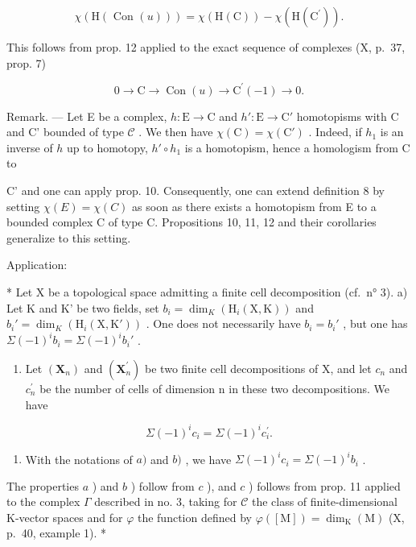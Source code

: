 \[
\chi (\mathrm{H} (\text { Con } (u))) = \chi (\mathrm{H} (\mathrm{C})) - \chi (\mathrm{H} (\mathrm{C} ^ {\prime})) .
\]

This follows from prop. 12 applied to the exact sequence of complexes (X, p.~37, prop. 7)

\[
0 \rightarrow \mathrm{C} \rightarrow \operatorname{Con} (u) \rightarrow \mathrm{C} ^ {\prime} (- 1) \rightarrow 0.
\]

Remark. --- Let E be a complex, \(h: \mathrm{E} \to \mathrm{C}\) and \(h': \mathrm{E} \to \mathrm{C}'\) homotopisms with C and C' bounded of type \(\mathcal{C}\) . We then have \(\chi(\mathrm{C}) = \chi(\mathrm{C}')\) . Indeed, if \(h_1\) is an inverse of \(h\) up to homotopy, \(h' \circ h_1\) is a homotopism, hence a homologism from C to

C' and one can apply prop. 10. Consequently, one can extend definition 8 by setting \(\chi(E) = \chi(C)\) as soon as there exists a homotopism from E to a bounded complex C of type C. Propositions 10, 11, 12 and their corollaries generalize to this setting.

Application:

* Let X be a topological space admitting a finite cell decomposition (cf.~n° 3). a) Let K and K' be two fields, set \(b_i = \dim_K(\mathrm{H}_i(\mathrm{X}, \mathrm{K}))\) and \(b_i' = \dim_K(\mathrm{H}_i(\mathrm{X}, \mathrm{K}'))\) . One does not necessarily have \(b_i = b_i'\) , but one has \(\Sigma(-1)^i b_i = \Sigma(-1)^i b_i'\) .

\begin{enumerate}
\def\labelenumi{\alph{enumi})}
\setcounter{enumi}{1}
\tightlist
\item
  Let \((\mathbf{X}_{n})\) and \((\mathbf{X}_{n}^{\prime})\) be two finite cell decompositions of X, and let \(c_{n}\) and \(c_{n}^{\prime}\) be the number of cells of dimension n in these two decompositions. We have
\end{enumerate}

\[
\Sigma (- 1) ^ {i} c _ {i} = \Sigma (- 1) ^ {i} c _ {i} ^ {\prime}.
\]

\begin{enumerate}
\def\labelenumi{\alph{enumi})}
\setcounter{enumi}{2}
\tightlist
\item
  With the notations of \(a)\) and \(b)\) , we have \(\Sigma(-1)^{i} c_{i} = \Sigma(-1)^{i} b_{i}\) .
\end{enumerate}

The properties \(a\) ) and \(b\) ) follow from \(c\) ), and \(c\) ) follows from prop. 11 applied to the complex \(\Gamma\) described in no. 3, taking for \(\mathscr{C}\) the class of finite-dimensional K-vector spaces and for \(\varphi\) the function defined by \(\varphi([\mathrm{M}]) = \dim_{\mathrm{K}}(\mathrm{M})\) (X, p.~40, example 1). *

